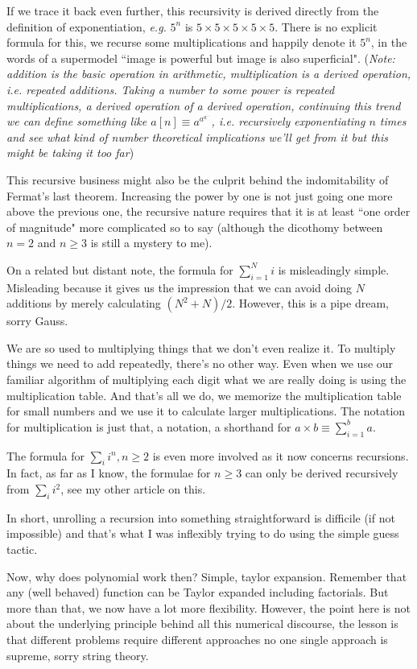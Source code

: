 \documentclass[aps,preprint,preprintnumbers,nofootinbib,showpacs,prd]{revtex4-1}
\newcommand{\ie}{{\it i.e.} }
\newcommand{\eg}{{\it e.g.} }
\begin{document}
If we trace it back even further, this recursivity is derived directly from the definition of exponentiation, \eg $5^n$ is $5 \times 5 \times 5 \times 5 \times 5$. There is no explicit formula for this, we recurse some multiplications and happily denote it $5^n$, in the words of a supermodel ``image is powerful but image is also superficial". ({\it Note: addition is the basic operation in arithmetic, multiplication is a derived operation, \ie repeated additions. Taking a number to some power is repeated multiplications, a derived operation of a derived operation, continuing this trend we can define something like $a[n] \equiv a^{a^{a^ {\dots}}}$, \ie recursively exponentiating $n$ times and see what kind of number theoretical implications we'll get from it but this might be taking it too far})

This recursive business might also be the culprit behind the indomitability of Fermat's last theorem. Increasing the power by one is not just going one more above the previous one, the recursive nature requires that it is at least ``one order of magnitude" more complicated so to say (although the dicothomy between $n=2$ and $n \ge 3$ is still a mystery to me).

On a related but distant note, the formula for $\sum_{i=1}^{N} i$ is misleadingly simple. Misleading because it gives us the impression that we can avoid doing $N$ additions by merely calculating $(N^2 + N)/2$. However, this is a pipe dream, sorry Gauss.

We are so used to multiplying things that we don't even realize it. To multiply things we need to add repeatedly, there's no other way. Even when we use our familiar algorithm of multiplying each digit what we are really doing is using the multiplication table. And that's all we do, we memorize the multiplication table for small numbers and we use it to calculate larger multiplications. The notation for multiplication is just that, a notation, a shorthand for $a \times b \equiv \sum_{i=1}^{b} a$.

The formula for $\sum_i i^n, n \ge 2$ is even more involved as it now concerns recursions. In fact, as far as I know, the formulae for $n \ge 3$ can only be derived recursively from $\sum_i i^2$, see my other article on this.

In short, unrolling a recursion into something straightforward is difficile (if not impossible) and that's what I was inflexibly trying to do using the simple guess tactic.

Now, why does polynomial work then? Simple, taylor expansion. Remember that any (well behaved) function can be Taylor expanded including factorials. But more than that, we now have a lot more flexibility. However, the point here is not about the underlying principle behind all this numerical discourse, the lesson is that different problems require different approaches no one single approach is supreme, sorry string theory.
\end{document}
